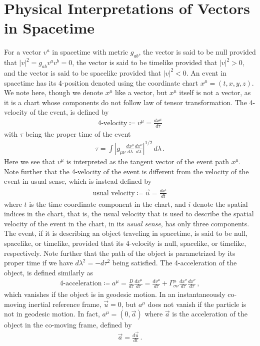\documentclass[11pt, onesided]{book}
\theoremstyle{break}
\theoremstyle{break}
\begin{document}
\section[Physical Interpretations of Vectors in Spacetime]{\color{red} Physical Interpretations of Vectors in Spacetime\color{black}}
For a vector $v^a$ in spacetime with metric $g_{ab}$, the vector is said to be null provided that $|v|^2 =  g_{ab}v^av^b = 0$, the vector is said to be timelike provided that $|v|^2 >0$, and the vector is said to be spacelike provided that $|v|^2<0$. An event in spacetime has its 4-position denoted using the coordinate chart $x^\mu = (t,x,y,z)$. We note here, though we denote $x^\mu$ like a vector, but $x^\mu$ itself is not a vector, as it is a chart whose components do not follow law of tensor transformation. The 4-velocity of the event, is defined by
\begin{align*}
\text{4-velocity} \coloneqq v^\mu = \frac{dx^\mu}{d\tau}
\end{align*}
with $\tau$ being the proper time of the event
\begin{align*}
\tau  = \int \left|g_{\mu\nu}\frac{dx^\mu}{d\lambda}\frac{dx^\nu}{d\lambda}\right|^{1/2}\, d\lambda\,.
\end{align*}
Here we see that $v^\mu$ is interpreted as the tangent vector of the event path $x^\mu$. Note further that the 4-velocity of the event is different from the velocity of the event in usual sense, which is instead defined by
\begin{align*}
\text{usual velocity}\coloneqq \vec{u} = \frac{dx^i}{dt}
\end{align*} 
where $t$ is the time coordinate component in the chart, and $i$ denote the spatial indices in the chart, that is, the usual velocity that is used to describe the spatial velocity of the event in the chart, in its \textit{usual sense}, has only three components. The event, if it is describing an object traveling in spacetime, is said to be null, spacelike, or timelike, provided that its 4-velocity is null, spacelike, or timelike, respectively. Note further that the path of the object is parametrized by its proper time if we have $d\lambda^2 = -d\tau^2$ being satisfied. The 4-acceleration of the object, is defined similarly as
\begin{align*}
\text{4-acceleration}\coloneqq a^\mu = \frac{D}{d\tau} \frac{dx^\mu}{d\tau} = \frac{dv^\mu}{d\tau} + \Gamma^{\mu}_{\sigma\nu}\frac{dx^\sigma}{d\tau}\frac{dx^\nu}{d\tau} \,,
\end{align*}
which vanishes if the object is in geodesic motion. In an instantaneously co-moving inertial reference frame, $\vec{u} = 0$, but $a^\mu$ does not vanish if the particle is not in geodesic motion. In fact, $a^\mu = (0,\vec{a})$ where $\vec{a}$ is the acceleration of the object in the co-moving frame, defined by 
\begin{align*}
\vec{a} = \frac{d\vec{u}}{dt}\,.
\end{align*}
\end{document}
